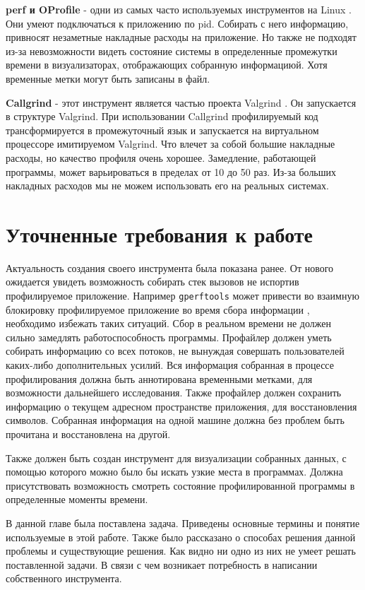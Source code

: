     \textbf{perf и OProfile} - одни из самых часто используемых инструментов на Linux \cite{ibm}. Они умеют подключаться к приложению по pid. Собирать с него информацию, привносят незаметные накладные расходы на приложение. Но также не подходят из-за невозможности видеть состояние системы в определенные промежутки времени в визуализаторах, отображающих собранную информациюй. Хотя временные метки могут быть записаны в файл.
    
    \textbf{Callgrind} - этот инструмент является частью проекта Valgrind \cite{valgrind}. Он запускается в структуре Valgrind. При использовании Callgrind профилируемый код трансформируется в промежуточный язык и запускается на виртуальном процессоре имитируемом Valgrind. Что влечет за собой большие накладные расходы, но качество профиля очень хорошее. Замедление, работающей программы, может варьироваться в пределах от 10 до 50 раз. Из-за больших накладных расходов мы не можем использовать его на реальных системах.
    
\section{Уточненные требования к работе}
	Актуальность создания своего инструмента была показана ранее. От нового ожидается увидеть возможность собирать стек вызовов не испортив профилируемое приложение. Например \verb|gperftools| может привести во взаимную блокировку профилируемое приложение во время сбора информации \cite{deadlock_gperf}, необходимо избежать таких ситуаций. Сбор в реальном времени не должен сильно замедлять работоспособность программы. Профайлер должен уметь собирать информацию со всех потоков, не вынуждая совершать пользователей каких-либо дополнительных усилий. Вся информация собранная в процессе профилирования должна быть аннотирована временными метками, для возможности дальнейшего исследования. Также профайлер должен сохранить информацию о текущем адресном пространстве приложения, для восстановления символов. Собранная информация на одной машине должна без проблем быть прочитана и восстановлена на другой. 
    
    Также должен  быть создан инструмент для визуализации собранных данных, с помощью которого можно было бы искать узкие места в программах. Должна присутствовать возможность смотреть состояние профилированной программы в определенные моменты времени.

\chapterconclusion
	В данной главе была поставлена задача. Приведены основные термины и понятие используемые в этой работе. Также было рассказано о способах решения данной проблемы и существующие решения. Как видно ни одно из них не умеет решать поставленной задачи. В связи с чем возникает потребность в написании собственного инструмента.
    